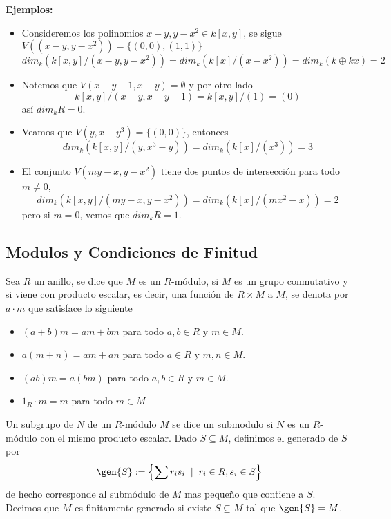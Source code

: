 \documentclass{article}
\begin{document}
\noindent\textbf{Ejemplos:}
\begin{itemize}
    \item Consideremos los polinomios $x-y,y-x^{2}\in k[x,y]$, se sigue 
    $V((x-y,y-x^{2}))=\{(0,0),(1,1)\}$
    \begin{equation*}
        dim_{k}\left(k[x,y]\Big/(x-y,y-x^{2})\right)=dim_{k}\left(k[x]\Big/(x-x^{2})\right)
        =dim_{k}\left(k\oplus kx\right)=2
    \end{equation*}

    \item Notemos que $V(x-y-1,x-y)=\emptyset$ y por otro lado
    \begin{equation*}
        k[x,y]\Big/(x-y,x-y-1)=k[x,y]\Big/(1)=(0)
    \end{equation*}
    así $dim_{k}R=0$.

    \item Veamos que $V(y,x-y^{3})=\{(0,0)\}$, entonces
    \begin{equation*}
        dim_{k}\left(k[x,y]\Big/(y,x^{3}-y)\right)=dim_{k}\left(k[x]\Big/(x^{3})\right)=3
    \end{equation*}

    \item El conjunto $V(my-x,y-x^{2})$ tiene dos puntos de intersección para todo $m\neq0$,
    \begin{equation*}
        dim_{k}\left(k[x,y]\Big/(my-x,y-x^{2})\right)=dim_{k}\left(k[x]\Big/(mx^{2}-x)\right)=2
    \end{equation*}
    pero si $m=0$, vemos que  $dim_{k}R=1$.
\end{itemize}

\subsection{Modulos y Condiciones de Finitud}
Sea $R$ un anillo, se dice que $M$ es un $R$-módulo, si $M$ es un grupo conmutativo y si viene con
producto escalar, es decir, una función de $R\times M$ a $M$, se denota por $a\cdot m$ que 
satisface lo siguiente
\begin{itemize}
    \item $(a+b)m=am+bm$ para todo $a,b\in R$ y $m\in M$.
    \item $a(m+n)=am+an$ para todo $a\in R$ y $m,n\in M$.
    \item $(ab)m=a(bm)$ para todo $a,b\in R$ y $m\in M$.
    \item $1_{R}\cdot m=m$ para todo $m\in M$
\end{itemize}
Un subgrupo de $N$ de un $R$-módulo $M$ se dice un submodulo si $N$ es un $R$-módulo con el mismo
producto escalar. Dado $S\subseteq M$, definimos el generado de $S$ por
\begin{equation*}
    \gen{S}:=\left\{\sum r_{i}s_{i}\hspace{2mm}|\hspace{2mm}r_{i}\in R,s_{i}\in S\right\}
\end{equation*}
de hecho corresponde al submódulo de $M$ mas pequeño que contiene a $S$. Decimos que $M$ es 
finitamente generado si existe $S\subseteq M$ tal que $\gen{S}=M$.
\vspace{4mm}
\end{document}
